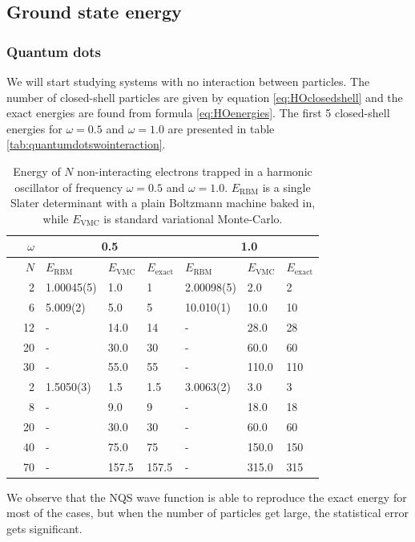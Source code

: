 \subsection{Ground state energy}
\subsubsection{Quantum dots}
We will start studying systems with no interaction between particles. The number of closed-shell particles are given by equation \eqref{eq:HOclosedshell} and the exact energies are found from formula \eqref{eq:HOenergies}. The first 5 closed-shell energies for $\omega=0.5$ and $\omega=1.0$ are presented in table \eqref{tab:quantumdotswointeraction}.

\begin{table} [H]
	\caption{Energy of $N$ non-interacting electrons trapped in a harmonic oscillator of frequency $\omega=0.5$ and $\omega=1.0$. $E_{\text{RBM}}$ is a single Slater determinant with a plain Boltzmann machine baked in, while $E_{\text{VMC}}$ is standard variational Monte-Carlo.}
	\label{tab:quantumdotswointeraction}
	\begin{tabularx}{\textwidth}{r|r|XXX:XXX} \hline\hline
		\label{tab:nn}
		& $\omega$ & &\\ \hline
		& $N$ & $E_{\text{RBM}}$ & $E_{\text{VMC}}$ & $E_{\text{exact}}$ & $E_{\text{RBM}}$ & $E_{\text{VMC}}$ & $E_{\text{exact}}$ \\ \hline
		
		\parbox[t]{2mm}{}
		&2 & 1.00045(5) & 1.0 & 1 & 2.00098(5) & 2.0 & 2\\
		&6 & 5.009(2) & 5.0 & 5 & 10.010(1) & 10.0 & 10 \\
		&12 & - & 14.0 & 14 & - & 28.0 & 28\\
		&20 & - & 30.0 & 30 & - & 60.0 & 60\\
		&30 & - & 55.0 & 55 & - & 110.0 & 110\\ \hline
		
		\parbox[t]{2mm}{}
		&2 & 1.5050(3) & 1.5 & 1.5 & 3.0063(2) & 3.0 & 3 \\
		&8 & - & 9.0 & 9 & - & 18.0 & 18 \\
		&20 & - & 30.0 & 30 & - & 60.0 & 60 \\
		&40 & - & 75.0 & 75 & - & 150.0 & 150 \\
		&70 & - & 157.5 & 157.5 & - & 315.0 & 315 \\ \hline\hline
	\end{tabularx}
\end{table}
We observe that the NQS wave function is able to reproduce the exact energy for most of the cases, but when the number of particles get large, the statistical error gets significant.

